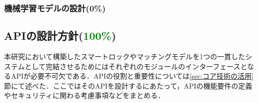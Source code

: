       \subsubsection{機械学習モデルの設計(0\%)}
        \label{sec:machine_learning_model_design}
          \par

  \subsection{APIの設計方針(\textcolor{green}{100\%})}
    \label{sec:APIの設計方針}
      \par 本研究において構築したスマートロックやマッチングモデルを1つの一貫したシステムとして完結させるためにはそれぞれのモジュールのインターフェースとなるAPIが必要不可欠である．APIの役割と重要性については\ref{sec:コア技術の活用}節にて述べた．ここではそのAPIを設計するにあたって，APIの機能要件の定義やセキュリティに関わる考慮事項などをまとめる．
      
